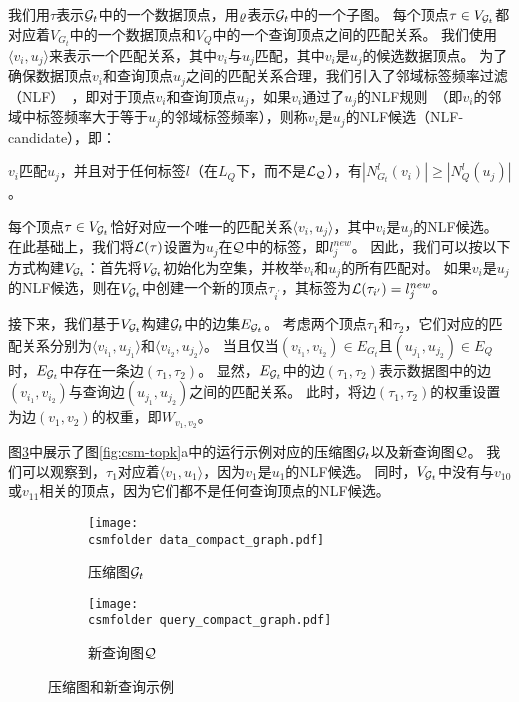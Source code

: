 我们用$\tau$表示$\mathcal{G}_t$中的一个数据顶点，用$\varrho$表示$\mathcal{G}_t$中的一个子图。
每个顶点$\tau \in V_{\mathcal{G}_t}$都对应着$V_{G_t}$中的一个数据顶点和$V_Q$中的一个查询顶点之间的匹配关系。
我们使用$\langle v_i, u_j \rangle$来表示一个匹配关系，其中$v_i$与$u_j$匹配，其中$v_i$是$u_j$的候选数据顶点。
为了确保数据顶点$v_i$和查询顶点$u_j$之间的匹配关系合理，我们引入了邻域标签频率过滤（NLF）~\cite{sgi-turbo-iso-DBLP:conf/sigmod/HanLL13}，即对于顶点$v_i$和查询顶点$u_j$，如果$v_i$通过了$u_j$的NLF规则~\cite{sgi-turbo-iso-DBLP:conf/sigmod/HanLL13}（即$v_i$的邻域中标签频率大于等于$u_j$的邻域标签频率），则称$v_i$是$u_j$的NLF候选（NLF-candidate），即：

$v_i$匹配$u_j$，并且对于任何标签$l$（在$L_Q$下，而不是$\mathcal{L}_{\mathcal{Q}}$），有$|N_{G_t}^l(v_i)| \geq |N_Q^l(u_j)|$。

每个顶点$\tau \in V_{\mathcal{G}_t}$恰好对应一个唯一的匹配关系$\langle v_i, u_j \rangle$，其中$v_i$是$u_j$的NLF候选。
在此基础上，我们将$\mathcal{L}(\tau)$设置为$u_j$在$\mathcal{Q}$中的标签，即$l_j^{new}$。
因此，我们可以按以下方式构建$V_{\mathcal{G}_t}$：首先将$V_{\mathcal{G}_t}$初始化为空集，并枚举$v_i$和$u_j$的所有匹配对。
如果$v_i$是$u_j$的NLF候选，则在$V_{\mathcal{G}_t}$中创建一个新的顶点$\tau_{i^\prime}$，其标签为$\mathcal{L}(\tau_{i^\prime}) = l_j^{new}$。

接下来，我们基于$V_{\mathcal{G}_t}$构建$\mathcal{G}_t$中的边集$E_{\mathcal{G}_t}$。
考虑两个顶点$\tau_1$和$\tau_2$，它们对应的匹配关系分别为$\langle v_{i_1}, u_{j_1} \rangle$和$\langle v_{i_2}, u_{j_2} \rangle$。
当且仅当$(v_{i_1}, v_{i_2}) \in E_{G_t}$且$(u_{j_1}, u_{j_2}) \in E_Q$时，$E_{\mathcal{G}_t}$中存在一条边$(\tau_1, \tau_2)$。
显然，$E_{\mathcal{G}_t}$中的边$(\tau_1, \tau_2)$表示数据图中的边$(v_{i_1}, v_{i_2})$与查询边$(u_{j_1}, u_{j_2})$之间的匹配关系。
此时，将边$(\tau_1, \tau_2)$的权重设置为边$(v_1, v_2)$的权重，即$W_{v_1, v_2}$。

图\ref{fig:compact}中展示了图\ref{fig:csm-topk}a中的运行示例对应的压缩图$\mathcal{G}_t$以及新查询图$\mathcal{Q}$。
我们可以观察到，$\tau_1$对应着$\langle v_1, u_1 \rangle$，因为$v_1$是$u_1$的NLF候选。
同时，$V_{\mathcal{G}_t}$中没有与$v_{10}$或$v_{11}$相关的顶点，因为它们都不是任何查询顶点的NLF候选。

\begin{figure}[h!]
\def\wscorevone{0.62}
\centering
\begin{subfigure}[t]{\wscorevone\linewidth}
\centering
\resizebox{\linewidth}{!}
{
\texttt{[image: \\csmfolder data\_compact\_graph.pdf]}
}
\caption{压缩图$\mathcal{G}_t$}
\label{fig:data_compact_graph}
\end{subfigure}
\begin{subfigure}[t]{0.35\linewidth}
\centering
\resizebox{\linewidth}{!}
{
\texttt{[image: \\csmfolder query\_compact\_graph.pdf]}
}
\caption{新查询图$\mathcal{Q}$}
\label{fig:query_compact_graph}
\end{subfigure}
\caption{压缩图和新查询示例}
\label{fig:compact}
\end{figure}



